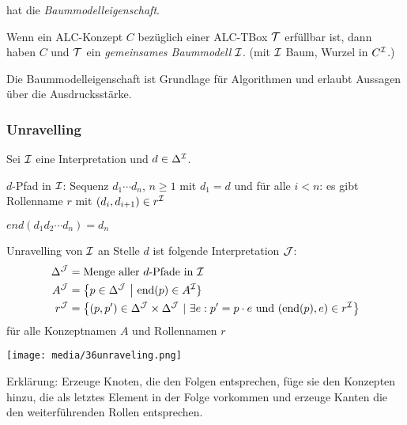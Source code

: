 \ALC hat die \emph{Baummodelleigenschaft}.

\begin{theorem}
    \label{theorem-3.6}
    \label{thm:baummodell}
Wenn ein ALC-Konzept $C$ bezüglich einer ALC-TBox $\mathcal{T}$ erfüllbar ist,
dann haben $C$ und $\mathcal{T}$ ein \emph{gemeinsames Baummodell} $\mathcal{I}$. (mit $\mathcal{I}$ Baum, Wurzel in $C^{\mathcal{I}}$.)
\end{theorem}

\begin{tafel}[TODO]

\end{tafel}

Die Baummodelleigenschaft ist Grundlage für Algorithmen und erlaubt Aussagen über die Ausdrucksstärke.

\subsubsection{Unravelling}\label{unravelling}

Sei $\mathcal{I}$ eine Interpretation und $d \in \Delta^{\mathcal{I}}$. 

$d$-Pfad in $\mathcal{I}$: Sequenz $d_1\cdots d_n$, $n \geq 1$ mit $d_1 = d$ und
für alle $i < n$: es gibt Rollenname $r$ mit $(d_i, d_{i + 1}) \in r^{\mathcal{I}}$

$\mathit{end}(d_1d_2\cdots d_n) = d_n$

\begin{definition}[Unravelling]
Unravelling von $\mathcal{I}$ an Stelle $d$ ist folgende Interpretation $\mathcal{J}$:
\begin{align*}
    \Delta^{\MJ} &= \text{Menge aller }d\text{-Pfade in }\MI\\
    A^{\MJ} &= \left\{ p \in \Delta^{\MJ}\  \right|\text{\ end}\left( p \right) \in A^\MI\}\\
    r^{\MJ} &= \left\{ \left( p,p' \right) \in \Delta^{\MJ} \times \Delta^{\MJ}\ |\ \exists e:p' = p \cdot e\ \mathrm{\text{und}}\ \left( \text{end}\left( p \right),e \right) \in r^\MI \right\}
\end{align*}
für alle Konzeptnamen $A$ und Rollennamen $r$
\end{definition}

\begin{tafel}[TODO]

\end{tafel}

\texttt{[image: media/36unraveling.png]}

Erklärung: Erzeuge Knoten, die den Folgen entsprechen, füge sie den
Konzepten hinzu, die als letztes Element in der Folge vorkommen und
erzeuge Kanten die den weiterführenden Rollen entsprechen.


